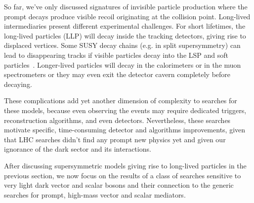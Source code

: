 So far, we've only discussed signatures of invisible particle production where the prompt decays produce visible recoil originating at the collision point. Long-lived intermediaries present different experimental challenges. 
For short lifetimes, the long-lived particles (LLP) will decay inside the tracking detectors, giving rise to displaced vertices. 
Some SUSY decay chains (e.g. in split supersymmetry) can lead to disappearing tracks if visible particles decay into the LSP and soft particles~\cite{Aaboud:2017mpt}. 
Longer-lived particles will decay in the calorimeters or in the muon spectrometers 
or they may even exit the detector cavern completely before decaying. 

These complications add yet another dimension of complexity to searches for these models, because even observing the events may require dedicated triggers, reconstruction algorithms, and even detectors\cite{Ball:2016zrp,Chou:2016lxi}. Nevertheless, these searches motivate specific, time-consuming detector and algorithms improvements, given that LHC searches didn't find any prompt new physics yet and given our ignorance of the dark sector and its interactions. 

After discussing supersymmetric models giving rise to long-lived particles in the previous section, we now focus on the results of a class of searches sensitive to very light dark vector and scalar bosons and their connection to the generic searches for prompt, high-mass vector and scalar mediators. 



